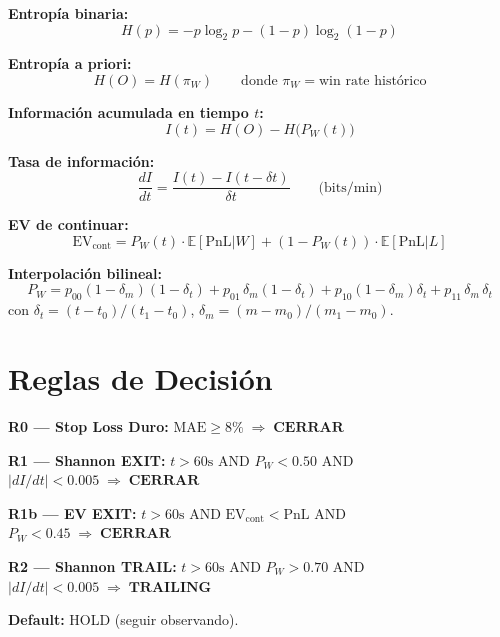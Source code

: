 \documentclass[11pt,a4paper]{article}
\newcommand{\pw}{P_W}
\newcommand{\E}{\mathbb{E}}
\begin{document}
\begin{tcolorbox}[formula, title=Todas las f\'ormulas necesarias]

\textbf{Entrop\'ia binaria:}
\begin{equation}
H(p) = -p\log_2 p - (1-p)\log_2(1-p)
\end{equation}

\textbf{Entrop\'ia a priori:}
\begin{equation}
H(O) = H(\pi_W) \qquad \text{donde } \pi_W = \text{win rate hist\'orico}
\end{equation}

\textbf{Informaci\'on acumulada en tiempo $t$:}
\begin{equation}
I(t) = H(O) - H\bigl(\pw(t)\bigr)
\end{equation}

\textbf{Tasa de informaci\'on:}
\begin{equation}
\frac{dI}{dt} = \frac{I(t) - I(t - \delta t)}{\delta t} \qquad \text{(bits/min)}
\end{equation}

\textbf{EV de continuar:}
\begin{equation}
\text{EV}_{\text{cont}} = \pw(t) \cdot \E[\text{PnL}|W] + (1 - \pw(t)) \cdot \E[\text{PnL}|L]
\end{equation}

\textbf{Interpolaci\'on bilineal:}
\begin{equation}
\pw = p_{00}(1{-}\delta_m)(1{-}\delta_t) + p_{01}\,\delta_m(1{-}\delta_t) + p_{10}(1{-}\delta_m)\delta_t + p_{11}\,\delta_m\,\delta_t
\end{equation}
con $\delta_t = (t - t_0)/(t_1 - t_0)$, $\delta_m = (m - m_0)/(m_1 - m_0)$.

\end{tcolorbox}

\section{Reglas de Decisi\'on}

\begin{tcolorbox}[decision, title=Las cuatro reglas (evaluadas en este orden)]

\textbf{R0 --- Stop Loss Duro:}
$\text{MAE} \geq 8\% \;\Longrightarrow\; \textbf{CERRAR}$

\medskip
\textbf{R1 --- Shannon EXIT:}
$t > 60\text{s}$ AND $\pw < 0.50$ AND $|dI/dt| < 0.005 \;\Longrightarrow\; \textbf{CERRAR}$

\medskip
\textbf{R1b --- EV EXIT:}
$t > 60\text{s}$ AND $\text{EV}_{\text{cont}} < \text{PnL}$ AND $\pw < 0.45 \;\Longrightarrow\; \textbf{CERRAR}$

\medskip
\textbf{R2 --- Shannon TRAIL:}
$t > 60\text{s}$ AND $\pw > 0.70$ AND $|dI/dt| < 0.005 \;\Longrightarrow\; \textbf{TRAILING}$

\medskip
\textbf{Default:} HOLD (seguir observando).
\end{tcolorbox}
\end{document}
